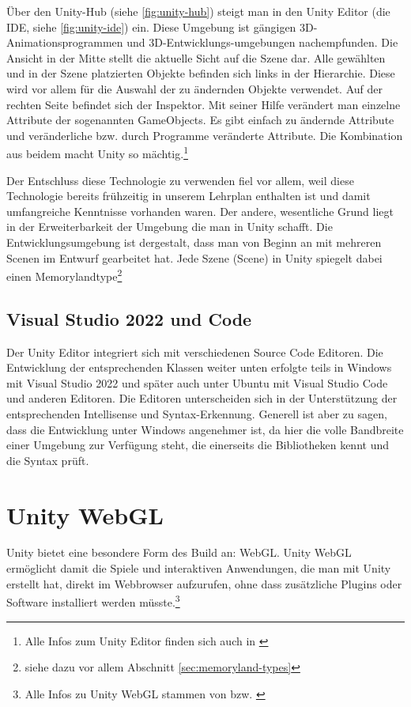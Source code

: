 Über den Unity-Hub (siehe \ref{fig:unity-hub}) steigt man in den Unity Editor (die IDE, siehe \ref{fig:unity-ide}) ein. Diese Umgebung ist gängigen 3D-Animationsprogrammen und 3D-Entwicklungs-umgebungen nachempfunden. Die Ansicht in der Mitte stellt die aktuelle Sicht auf die Szene dar. Alle gewählten und in der Szene platzierten Objekte befinden sich links in der Hierarchie. Diese wird vor allem für die Auswahl der zu ändernden Objekte verwendet. Auf der rechten Seite befindet sich der Inspektor. Mit seiner Hilfe verändert man einzelne Attribute der sogenannten GameObjects. Es gibt einfach zu ändernde Attribute und veränderliche bzw. durch Programme veränderte Attribute. Die Kombination aus beidem macht Unity so mächtig.\footnote{Alle Infos zum Unity Editor finden sich auch in \cite{UnityDocsEditor}}


Der Entschluss diese Technologie zu verwenden fiel vor allem, weil diese Technologie bereits frühzeitig in unserem Lehrplan enthalten ist und damit umfangreiche Kenntnisse vorhanden waren. Der andere, wesentliche Grund liegt in der Erweiterbarkeit der Umgebung die man in Unity schafft. Die Entwicklungsumgebung ist dergestalt, dass man von Beginn an mit mehreren Scenen im Entwurf gearbeitet hat. Jede Szene (Scene) in Unity spiegelt dabei einen Memorylandtype\footnote{siehe dazu vor allem Abschnitt \ref{sec:memoryland-types}}



\subsection{Visual Studio 2022 und Code}

Der Unity Editor integriert sich mit verschiedenen Source Code Editoren. Die Entwicklung der entsprechenden Klassen weiter unten erfolgte teils in Windows mit Visual Studio 2022 und später auch unter Ubuntu mit Visual Studio Code und anderen Editoren. Die Editoren unterscheiden sich in der Unterstützung der entsprechenden Intellisense und Syntax-Erkennung. Generell ist aber zu sagen, dass die Entwicklung unter Windows angenehmer ist, da hier die volle Bandbreite einer Umgebung zur Verfügung steht, die einerseits die Bibliotheken kennt und die Syntax prüft.



\section{Unity WebGL}

Unity bietet eine besondere Form des Build an: WebGL. Unity WebGL ermöglicht damit die Spiele und interaktiven Anwendungen, die man mit Unity erstellt hat, direkt im Webbrowser aufzurufen, ohne dass zusätzliche Plugins oder Software installiert werden müsste.\footnote{Alle Infos zu Unity WebGL stammen von \cite{UnityDocsWebGL} bzw. \cite{WebGL}}


